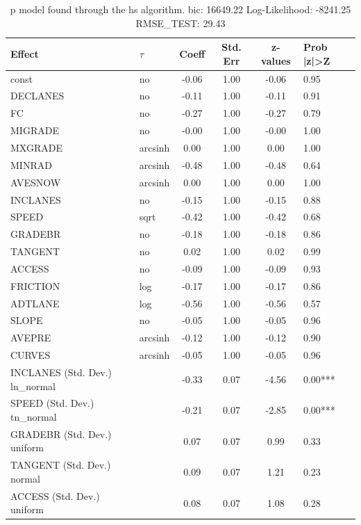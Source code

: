 \begin{table}
	\caption{p model found through the hs algorithm. bic: 16649.22 Log-Likelihood: -8241.25 RMSE_TEST: 29.43}
	\begin{center}
		\begin{tabular}{|l|l|c|c|c|l|}
			\hline
			Effect & $\tau$ & Coeff & Std. Err & z-values & Prob |z|>Z \\
			\hline
			const & no & -0.06 & 1.00 & -0.06 & 0.95 \\
			\hline
			DECLANES & no & -0.11 & 1.00 & -0.11 & 0.91 \\
			\hline
			FC & no & -0.27 & 1.00 & -0.27 & 0.79 \\
			\hline
			MIGRADE & no & -0.00 & 1.00 & -0.00 & 1.00 \\
			\hline
			MXGRADE & arcsinh & 0.00 & 1.00 & 0.00 & 1.00 \\
			\hline
			MINRAD & arcsinh & -0.48 & 1.00 & -0.48 & 0.64 \\
			\hline
			AVESNOW & arcsinh & 0.00 & 1.00 & 0.00 & 1.00 \\
			\hline
			INCLANES & no & -0.15 & 1.00 & -0.15 & 0.88 \\
			\hline
			SPEED & sqrt & -0.42 & 1.00 & -0.42 & 0.68 \\
			\hline
			GRADEBR & no & -0.18 & 1.00 & -0.18 & 0.86 \\
			\hline
			TANGENT & no & 0.02 & 1.00 & 0.02 & 0.99 \\
			\hline
			ACCESS & no & -0.09 & 1.00 & -0.09 & 0.93 \\
			\hline
			FRICTION & log & -0.17 & 1.00 & -0.17 & 0.86 \\
			\hline
			ADTLANE & log & -0.56 & 1.00 & -0.56 & 0.57 \\
			\hline
			SLOPE & no & -0.05 & 1.00 & -0.05 & 0.96 \\
			\hline
			AVEPRE & arcsinh & -0.12 & 1.00 & -0.12 & 0.90 \\
			\hline
			CURVES & arcsinh & -0.05 & 1.00 & -0.05 & 0.96 \\
			\hline
			INCLANES (Std. Dev.) ln_normal &  & -0.33 & 0.07 & -4.56 & 0.00*** \\
			\hline
			SPEED (Std. Dev.) tn_normal &  & -0.21 & 0.07 & -2.85 & 0.00*** \\
			\hline
			GRADEBR (Std. Dev.) uniform &  & 0.07 & 0.07 & 0.99 & 0.33 \\
			\hline
			TANGENT (Std. Dev.) normal &  & 0.09 & 0.07 & 1.21 & 0.23 \\
			\hline
			ACCESS (Std. Dev.) uniform &  & 0.08 & 0.07 & 1.08 & 0.28 \\

\end{tabular}
\end{center}
\end{table}
